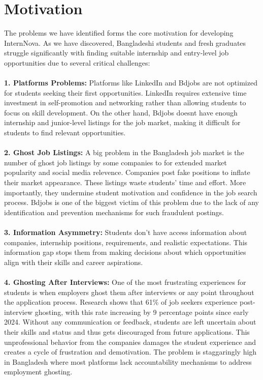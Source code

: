 \documentclass[a4paper, 14pt, openany]{extreport}
\begin{document}
	
	\section{Motivation}
	The problems we have identified forms the core motivation for developing InternNova. As we have discovered, Bangladeshi students and fresh graduates struggle significantly with finding suitable internship and entry-level job opportunities due to several critical challenges:
	\\
\\
	\textbf{1. Platforms Problems:} Platforms like LinkedIn\cite{linkedin} and Bdjobs\cite{bdjobs} are not optimized for students seeking their first opportunities. LinkedIn requires extensive time investment in self-promotion and networking rather than allowing students to focus on skill development. On the other hand, Bdjobs\cite{bdjobs} doesnt have enough internship and junior-level listings for the job market, making it difficult for students to find relevant opportunities.
	\\
\\
	\textbf{2. Ghost Job Listings:} A big problem in the Bangladesh job market is the number of ghost job listings\cite{bmutasim_ghost_jobs} by some companies to for extended market popularity and social media relevence. Companies post fake positions to inflate their market appearance. These listings waste students' time and effort. More importantly, they undermine student motivation and confidence in the job search process. Bdjobs\cite{bdjobs} is one of the biggest victim of this problem due to the lack of any identification and prevention mechanisms for such fraudulent postings.
	\\
\\
	\textbf{3. Information Asymmetry:} Students don't have access information about companies, internship positions, requirements, and realistic expectations. This information gap stops them from making decisions about which opportunities align with their skills and career aspirations\cite{jiang_information_asymmetry}.
	\\
\\
	\textbf{4. Ghosting After Interviews:} One of the most frustrating experiences for students is when employers ghost them after interviews or any point throughout the application process. Research shows that 61\% of job seekers experience post-interview ghosting, with this rate increasing by 9 percentage points since early 2024\cite{ghosting_index_2025}. Without any communication or feedback, students are left uncertain about their skills and status and thus gets discouraged from future applications. This unprofessional behavior from the companies damages the student experience and creates a cycle of frustration and demotivation. The problem is staggaringly high in Bangladesh where most platforms lack accountability mechanisms to address employment ghosting.
\end{document}
